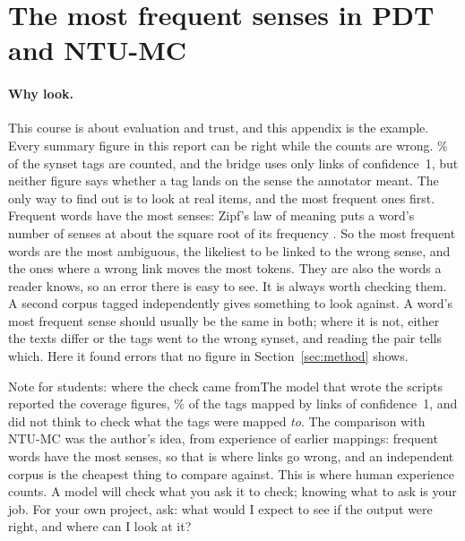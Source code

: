 \documentclass[a4paper,12pt]{article}
\newcommand{\aside}[2]{\begin{asidebox}{#1}\small #2\end{asidebox}}
\begin{document}


\appendix

\section{The most frequent senses in PDT and NTU-MC}
\label{app:ntumc}

\paragraph{Why look.}  This course is about evaluation and trust, and
this appendix is the example.  Every summary figure in this report can be
right while the counts are wrong.  \% of the synset
tags are counted, and the bridge uses only links of confidence~1, but
neither figure says whether a tag lands on the sense the annotator meant.
The only way to find out is to look at real items, and the most frequent
ones first.  Frequent words have the most senses: Zipf's law of meaning
puts a word's number of senses at about the square root of its frequency
\citep{zipf1945}.  So the most frequent words are the most ambiguous, the
likeliest to be linked to the wrong sense, and the ones where a wrong
link moves the most tokens.  They are also the words a reader knows, so
an error there is easy to see.  It is always worth checking them.  A
second corpus tagged independently gives something to look against.  A
word's most frequent sense should usually be the same in both; where it
is not, either the texts differ or the tags went to the wrong synset, and
reading the pair tells which.  Here it found errors that no figure in
Section~\ref{sec:method} shows.

\aside{Note for students: where the check came from}{The model that wrote
the scripts reported the coverage figures, \fact{freq.counted.share}\% of
the tags mapped by links of confidence~1, and did not think to check what
the tags were mapped \emph{to}.  The comparison with NTU-MC was the
author's idea, from experience of earlier mappings: frequent words have
the most senses, so that is where links go wrong, and an independent
corpus is the cheapest thing to compare against.  This is where human
experience counts.  A model will check what you ask it to check; knowing
what to ask is your job.  For your own project, ask: what would I expect
to see if the output were right, and where can I look at it?}
\end{document}
